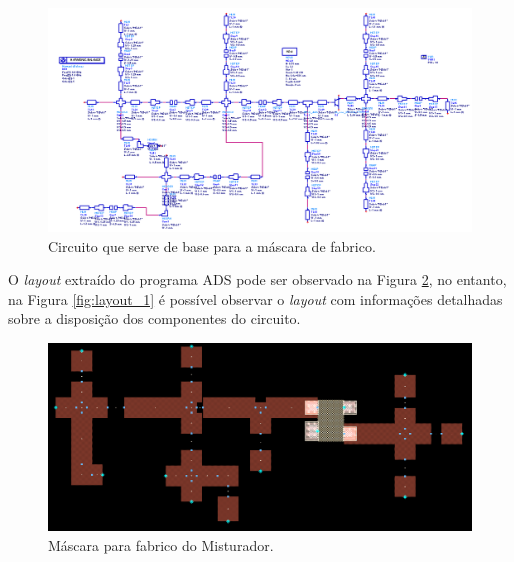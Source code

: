 \documentclass[11pt]{article}
\numberwithin{equation}{section}
\begin{document}
\begin{figure}[h]
	\centering
	\includegraphics[keepaspectratio=true, scale=0.45]{exps/Circuito_5}
	\vspace{-0.5em}
	\caption{Circuito que serve de base para a máscara de fabrico.}
	\vspace{-0.8em}
	\label{fig:Circuito_5}
\end{figure}

O \textit{layout} extraído do programa ADS pode ser observado na Figura \ref{fig:layout_0}, no entanto, na Figura \ref{fig:layout_1}  é possível observar o \textit{layout} com informações detalhadas sobre a disposição dos componentes do circuito.

\begin{figure}[h]
	\centering
	\includegraphics[keepaspectratio=true, scale=0.45]{exps/layout_0}
	\vspace{-0.5em}
	\caption{Máscara para fabrico do Misturador.}
	\vspace{-0.8em}
	\label{fig:layout_0}
\end{figure}
\end{document}

